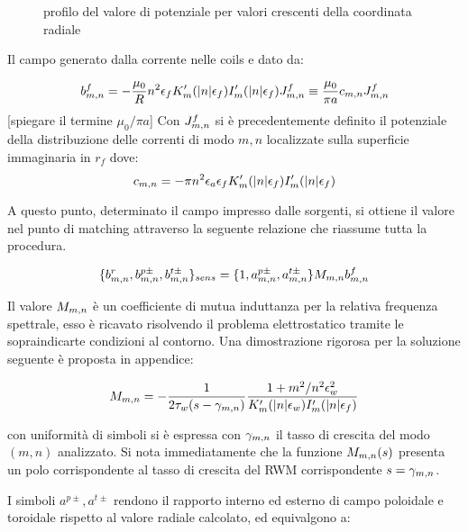 \begin{figure}[ht]
\caption{profilo del valore di potenziale per valori crescenti della
 coordinata radiale}
\end{figure}

Il campo generato dalla corrente nelle coils e dato da:

\begin{equation}
 \label{eq:bf_coils}
 b^f_{m,n} = -\frac{\mu_0}{R} n^2 \epsilon_f K'_m(|n|\epsilon_f) I'_m(|n|\epsilon_f) J^f_{m,n}
  \equiv \frac{\mu_0}{\pi a}c_{m,n} J^f_{m,n}
\end{equation}
[spiegare il termine $\mu_0/\pi a$]
Con $J^f_{m,n}$ si è precedentemente definito il potenziale della
distribuzione delle correnti di modo $m,n$ localizzate sulla superficie
immaginaria in $r_f$ dove:
\begin{equation}
 c_{m,n} = -\pi n^2 \epsilon_a \epsilon_f K'_m(|n|\epsilon_f) I'_m(|n|\epsilon_f)
\end{equation}

A questo punto, determinato il campo impresso dalle sorgenti, si ottiene
il valore nel punto di matching attraverso la seguente relazione che
riassume tutta la procedura.

\begin{equation}
 \label{eq:bw_coils}
 \{b^r_{m,n},b^{p\pm}_{m,n}, b^{t\pm}_{m,n} \}_{sens} =
  \{1,a^{p\pm}_{m,n},a^{t\pm}_{m,n}\} M_{m,n} b^f_{m,n}
\end{equation}

Il valore $M_{m,n}$ è un coefficiente di mutua induttanza per la relativa
frequenza spettrale, esso è ricavato risolvendo il problema
elettrostatico tramite le sopraindicarte condizioni al contorno. Una
dimostrazione rigorosa per la soluzione seguente è proposta in
appendice:

\begin{equation}
 \label{eq:emme}
  M_{m,n} = - \frac{1}{2\tau_w(s-\gamma_{m,n})} \frac{1+m^2/n^2\epsilon_w^2}{K'_m(|n|\epsilon_w)I'_m(|n|\epsilon_f)}
\end{equation}

con uniformità di simboli si è espressa con $\gamma_{m,n}$ il tasso di
crescita del modo $(m,n)$ analizzato. Si nota immediatamente che la
funzione $M_{m,n}(s)$ presenta un polo corrispondente al tasso di
crescita del RWM corrispondente $s=\gamma_{m,n}$.

I simboli $a^{p\pm},a^{t\pm}$ rendono il rapporto interno ed esterno di
campo poloidale e toroidale rispetto al valore radiale calcolato, ed
equivalgono a:

